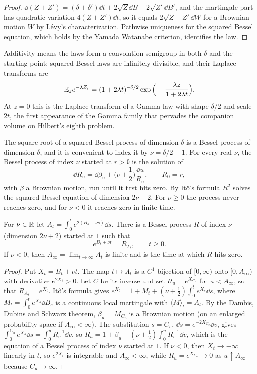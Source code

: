 \begin{proof}
$\dd(Z+Z') = (\delta+\delta')\dd t + 2\sqrt{Z}\dd B + 2\sqrt{Z'}\dd B'$, and the martingale part has quadratic variation $4(Z+Z')\dd t$, so it equals $2\sqrt{Z+Z'}\dd W$ for a Brownian motion $W$ by L\'evy's characterization. Pathwise uniqueness for the squared Bessel equation, which holds by the Yamada Watanabe criterion, identifies the law.
\end{proof}

Additivity means the laws form a convolution semigroup in both $\delta$ and the starting point: squared Bessel laws are infinitely divisible, and their Laplace transforms are
\[
\mathbb{E}_z e^{-\lambda Z_t} = (1+2\lambda t)^{-\delta/2}\exp\Big(-\frac{\lambda z}{1+2\lambda t}\Big).
\]
At $z=0$ this is the Laplace transform of a Gamma law with shape $\delta/2$ and scale $2t$, the first appearance of the Gamma family that pervades the companion volume on Hilbert's eighth problem.

The square root of a squared Bessel process of dimension $\delta$ is a Bessel process of dimension $\delta$, and it is convenient to index it by $\nu = \delta/2-1$. For every real $\nu$, the Bessel process of index $\nu$ started at $r>0$ is the solution of
\[
\dd R_u = \dd\beta_u + \Big(\nu+\frac12\Big)\frac{\dd u}{R_u},\qquad R_0 = r,
\]
with $\beta$ a Brownian motion, run until it first hits zero. By Itô's formula $R^2$ solves the squared Bessel equation of dimension $2\nu+2$. For $\nu\geq0$ the process never reaches zero, and for $\nu<0$ it reaches zero in finite time.

\begin{theorem}
\label{thm:lamperti}
For $\nu\in\mathbb{R}$ let $A_t = \int_0^t e^{2(B_s+\nu s)}\dd s$. There is a Bessel process $R$ of index $\nu$ (dimension $2\nu+2$) started at $1$ such that
\[
e^{B_t + \nu t} = R_{A_t},\qquad t\geq0.
\]
If $\nu<0$, then $A_\infty = \lim_{t\to\infty}A_t$ is finite and is the time at which $R$ hits zero.
\end{theorem}

\begin{proof}
Put $X_t = B_t+\nu t$. The map $t\mapsto A_t$ is a $C^1$ bijection of $[0,\infty)$ onto $[0,A_\infty)$ with derivative $e^{2X_t}>0$. Let $C$ be its inverse and set $R_u = e^{X_{C_u}}$ for $u<A_\infty$, so that $R_{A_t} = e^{X_t}$. Itô's formula gives $e^{X_t} = 1+M_t+(\nu+\frac12)\int_0^te^{X_s}\dd s$, where $M_t = \int_0^te^{X_s}\dd B_s$ is a continuous local martingale with $\langle M\rangle_t = A_t$. By the Dambis, Dubins and Schwarz theorem, $\beta_u = M_{C_u}$ is a Brownian motion (on an enlarged probability space if $A_\infty<\infty$). The substitution $s = C_v$, $\dd s = e^{-2X_{C_v}}\dd v$, gives $\int_0^{C_u}e^{X_s}\dd s = \int_0^uR_v^{-1}\dd v$, so $R_u = 1+\beta_u+(\nu+\frac12)\int_0^uR_v^{-1}\dd v$, which is the equation of a Bessel process of index $\nu$ started at $1$. If $\nu<0$, then $X_t\to-\infty$ linearly in $t$, so $e^{2X_t}$ is integrable and $A_\infty<\infty$, while $R_u = e^{X_{C_u}}\to0$ as $u\uparrow A_\infty$ because $C_u\to\infty$.
\end{proof}

